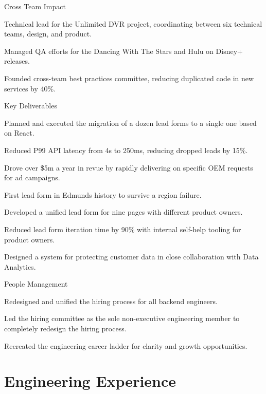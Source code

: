 \documentclass[]{deedy-resume-openfont}
\begin{document}
Cross Team Impact
\begin{tightemize}
  \item Technical lead for the Unlimited DVR project, coordinating between six technical teams, design, and product.
  \item Managed QA efforts for the Dancing With The Stars and Hulu on Disney+ releases.
  \item Founded cross-team best practices committee, reducing duplicated code in new services by 40\%.
\end{tightemize}
\sectionsep

\vspace{\topsep}
Key Deliverables
\begin{tightemize}
\item Planned and executed the migration of a dozen lead forms to a single one based on React.
\item Reduced P99 API latency from 4s to 250ms, reducing dropped leads by 15\%.
\item Drove over \$5m a year in revue by rapidly delivering on specific OEM requests for ad campaigns.
\item First lead form in Edmunds history to survive a region failure.
\item Developed a unified lead form for nine pages with different product owners.
\item Reduced lead form iteration time by 90\% with internal self-help tooling for product owners.
\item Designed a system for protecting customer data in close collaboration with Data Analytics.
\end{tightemize}
\sectionsep
People Management
\begin{tightemize}
  \item Redesigned and unified the hiring process for all backend engineers.
  \item Led the hiring committee as the sole non-executive engineering member to completely redesign the hiring process.
  \item Recreated the engineering career ladder for clarity and growth opportunities.
\end{tightemize}

\sectionsep

\section{Engineering Experience}
\end{document}
